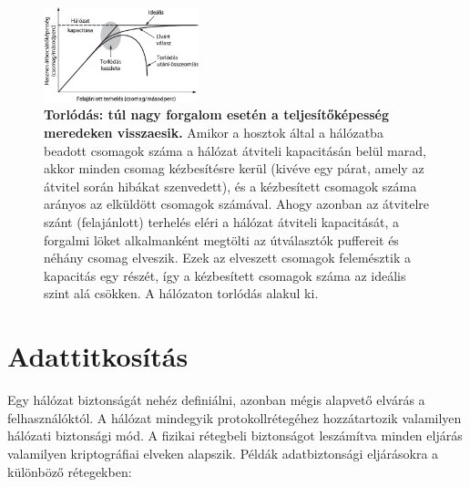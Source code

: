 \documentclass[12pt]{article}
\theoremstyle{plain}
\begin{document}
    \begin{figure}[H]
    \begin{center}
    \includegraphics[width=0.4\textwidth]{media/torlodas.png}
    \caption{\textbf{Torlódás: túl nagy forgalom esetén a teljesítőképesség meredeken visszaesik.} Amikor a hosztok által a hálózatba beadott csomagok száma a hálózat átviteli kapacitásán belül marad, akkor minden csomag kézbesítésre kerül (kivéve egy párat, amely az átvitel során hibákat szenvedett), és a kézbesített csomagok száma arányos az elküldött csomagok számával. Ahogy azonban az átvitelre szánt (felajánlott) terhelés eléri a hálózat átviteli kapacitását, a forgalmi löket alkalmanként megtölti az útválasztók puffereit és néhány csomag elveszik. Ezek az elveszett csomagok felemésztik a kapacitás egy részét, így a kézbesített csomagok száma az ideális szint alá csökken. A hálózaton torlódás alakul ki.}
    \label{fig:torl}
    \end{center}
\end{figure}

\section{Adattitkosítás}

Egy hálózat biztonságát nehéz definiálni, azonban mégis alapvető elvárás a felhasználóktól. A hálózat mindegyik protokollrétegéhez hozzátartozik valamilyen hálózati biztonsági mód. A fizikai rétegbeli biztonságot leszámítva minden eljárás valamilyen kriptográfiai elveken alapszik. Példák adatbiztonsági eljárásokra a különböző rétegekben:
\end{document}
